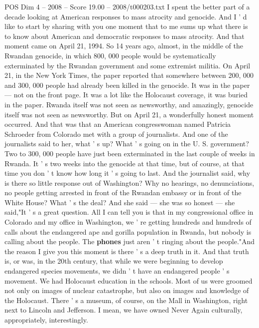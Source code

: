 \begin{textsample}{POS Dim 4 – 2008 – Score 19.00 – 2008/t000203.txt}  \label{ex:f4_pos_055}
I spent the better part of a decade looking at American responses to mass atrocity and genocide.
And I ' d like to start by sharing with you one moment that to me sums up what there is to know about American and democratic responses to mass atrocity.
And that moment came on April 21, 1994.
So 14 years ago, almost, in the middle of the Rwandan genocide, in which 800, 000 people would be systematically exterminated by the Rwandan government and some extremist militia.
On April 21, in the New York Times, the paper reported that somewhere between 200, 000 and 300, 000 people had already been killed in the genocide.
It was in the paper — not on the front page.
It was a lot like the Holocaust coverage, it was buried in the paper.
Rwanda itself was not seen as newsworthy, and amazingly, genocide itself was not seen as newsworthy.
But on April 21, a wonderfully honest moment occurred.
And that was that an American congresswoman named Patricia Schroeder from Colorado met with a group of journalists.
And one of the journalists said to her, what ' s up?
What ' s going on in the U.
S. government?
Two to 300, 000 people have just been exterminated in the last couple of weeks in Rwanda.
It ' s two weeks into the genocide at that time, but of course, at that time you don ' t know how long it ' s going to last.
And the journalist said, why is there so little response out of Washington?
Why no hearings, no denunciations, no people getting arrested in front of the Rwandan embassy or in front of the White House?
What ' s the deal?
And she said — she was so honest — she said,"It ' s a great question.
All I can tell you is that in my congressional office in Colorado and my office in Washington, we ' re getting hundreds and hundreds of calls about the endangered ape and gorilla population in Rwanda, but nobody is calling about the people.
The \textbf{phones} just aren ' t ringing about the people."And the reason I give you this moment is there ' s a deep truth in it.
And that truth is, or was, in the 20th century, that while we were beginning to develop endangered species movements, we didn ' t have an endangered people ' s movement.
We had Holocaust education in the schools.
Most of us were groomed not only on images of nuclear catastrophe, but also on images and knowledge of the Holocaust.
There ' s a museum, of course, on the Mall in Washington, right next to Lincoln and Jefferson.
I mean, we have owned Never Again culturally, appropriately, interestingly.

\end{textsample}
